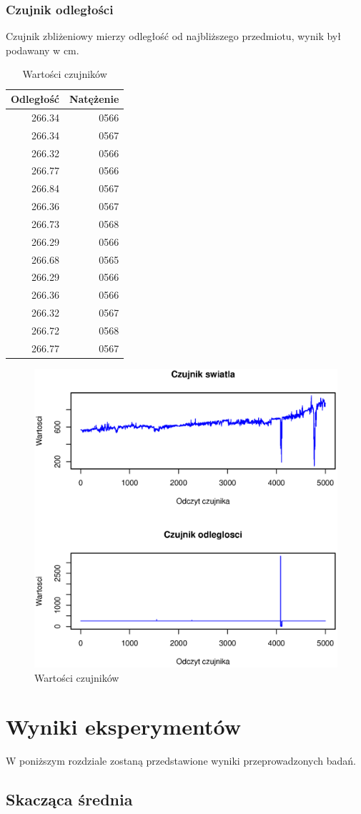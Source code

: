 \subsubsection*{Czujnik odległości}
Czujnik zbliżeniowy mierzy odległość od najbliższego przedmiotu,
wynik był podawany w cm.
\begin{table}[h]
  \label{tab:DeviceValues}
  \centering
  \begin{tabular}{r r}
    \multicolumn{1}{l}{Odległość} & \multicolumn{1}{l}{Natężenie} \\
    \hline
    266.34 & 0566 \\
    266.34 & 0567 \\
    266.32 & 0566 \\
    266.77 & 0566 \\
    266.84 & 0567 \\
    266.36 & 0567 \\
    266.73 & 0568 \\
    266.29 & 0566 \\
    266.68 & 0565 \\
    266.29 & 0566 \\
    266.36 & 0566 \\
    266.32 & 0567 \\
    266.72 & 0568 \\
    266.77 & 0567 \\
  \end{tabular}
  \caption{Wartości czujników}
\end{table}
\begin{figure}[htbp]
  \centering
  \includegraphics[width=1\textwidth]{img/ch-5-device}
  \caption{Wartości czujników}
  \label{fig:DeviceValues}
\end{figure}
\newpage
\section{Wyniki eksperymentów}
W poniższym rozdziale zostaną przedstawione wyniki przeprowadzonych badań.
\subsection{Skacząca średnia}

